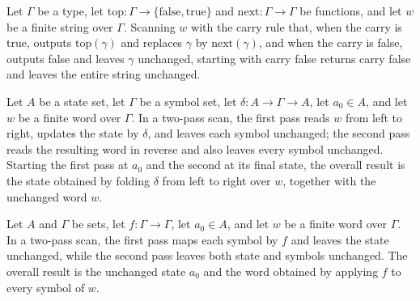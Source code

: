 \begin{theorem}
\label{Turing.mealyRun_carry_clear}
\leanok
{}
Let $\Gamma$ be a type, let $\mathrm{top}:\Gamma\to\{\mathrm{false},\mathrm{true}\}$ and
$\mathrm{next}:\Gamma\to\Gamma$ be functions, and let $w$ be a finite string over
$\Gamma$. Scanning $w$ with the carry rule that, when the carry is true, outputs
$\mathrm{top}(\gamma)$ and replaces $\gamma$ by $\mathrm{next}(\gamma)$, and when the
carry is false, outputs false and leaves $\gamma$ unchanged, starting with carry false
returns carry false and leaves the entire string unchanged.
\end{theorem}

\begin{theorem}
\label{Turing.scanResult_fold}
\leanok
{}
Let $A$ be a state set, let $\Gamma$ be a symbol set, let $\delta:A\to\Gamma\to A$, let
$a_0\in A$, and let $w$ be a finite word over $\Gamma$. In a two-pass scan, the first
pass reads $w$ from left to right, updates the state by $\delta$, and leaves each symbol
unchanged; the second pass reads the resulting word in reverse and also leaves every
symbol unchanged. Starting the first pass at $a_0$ and the second at its final state,
the overall result is the state obtained by folding $\delta$ from left to right over
$w$, together with the unchanged word $w$.
\end{theorem}

\begin{theorem}
\label{Turing.scanResult_map}
\leanok
{}
Let $A$ and $\Gamma$ be sets, let $f:\Gamma\to\Gamma$, let $a_0\in A$, and let $w$ be a
finite word over $\Gamma$. In a two-pass scan, the first pass maps each symbol by $f$
and leaves the state unchanged, while the second pass leaves both state and symbols
unchanged. The overall result is the unchanged state $a_0$ and the word obtained by
applying $f$ to every symbol of $w$.
\end{theorem}

